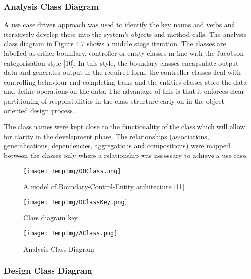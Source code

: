 \documentclass[fontsize=11pt]{extarticle}
\numberwithin{figure}{section} %
\numberwithin{table}{section}%
\begin{document}
\hypertarget{analysis-class-diagram}{%
\subsubsection{Analysis Class Diagram}\label{analysis-class-diagram}}

A use case driven approach was used to identify the key nouns and verbs
and iteratively develop these into the system's objects and method
calls. The analysis class diagram in Figure 4.7 shows a middle stage
iteration. The classes are labelled as either boundary, controller or
entity classes in line with the Jacobson categorisation style {[}10{]}.
In this style, the boundary classes encapsulate output data and
generates output in the required form, the controller classes deal with
controlling behaviour and completing tasks and the entities classes
store the data and define operations on the data. The advantage of this
is that it enforces clear partitioning of responsibilities in the class
structure early on in the object-oriented design process.

The class names were kept close to the functionality of the class which
will allow for clarity in the development phase. The relationships
(associations, generalisations, dependencies, aggregations and
compositions) were mapped between the classes only where a relationship
was necessary to achieve a use case.

\begin{figure}[H]
      \centering
      \texttt{[image: TempImg/OOClass.png]}
      \caption{A model of Boundary-Control-Entity architecture [11]}
 \end{figure}

\begin{figure}[H]
      \centering
      \texttt{[image: TempImg/DClassKey.png]}
      \caption{Class diagram key}
 \end{figure}

\begin{figure}[H]
      \centering
      \texttt{[image: TempImg/AClass.png]}
      \caption{Analysis Class Diagram}
 \end{figure}

\hypertarget{design-class-diagram}{%
\subsubsection{Design Class Diagram}\label{design-class-diagram}}
\end{document}
